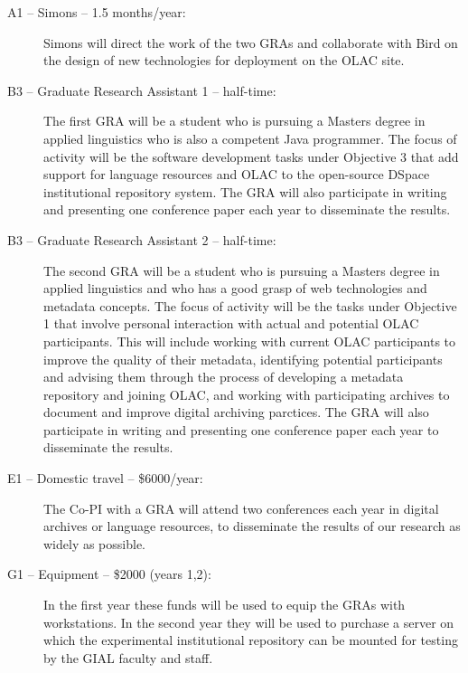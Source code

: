 \documentclass[11pt]{nsf}
\begin{document}
\begin{description}
\item[A1 -- Simons -- 1.5 months/year:]
Simons will direct the work of the two GRAs and collaborate with Bird
on the design of new technologies for deployment on the OLAC site.

\item[B3 -- Graduate Research Assistant 1 -- half-time:]
The first GRA will be a student who is pursuing a Masters degree in 
applied linguistics who is also
a competent Java programmer. The focus of activity will be
the software development tasks under Objective 3 that add
support for language resources and OLAC to the open-source DSpace
institutional repository system. The GRA will also participate
in writing and presenting one conference paper each year
to disseminate the results.

\item[B3 -- Graduate Research Assistant 2 -- half-time:]
The second GRA will be a student who is pursuing a Masters degree in 
applied linguistics and who has a good grasp of web technologies and
metadata concepts. The focus of activity will be
the tasks under Objective 1 that involve personal interaction
with actual and potential OLAC participants.  This will include
working with current OLAC participants to improve the quality of their
metadata, identifying potential participants and advising
them through the process of developing a metadata repository and joining
OLAC, and working with participating archives to document
and improve digital archiving parctices. The GRA will also participate
in writing and presenting one conference paper each year
to disseminate the results.

\item[E1 -- Domestic travel -- \$6000/year:]
The Co-PI with a GRA will attend two conferences each year in digital archives or
language resources, to disseminate the results of our research as
widely as possible.

\item[G1 -- Equipment -- \$2000 (years 1,2):]
In the first year these funds will be used
to equip the GRAs with workstations.  In the second year they will
be used to purchase a server on which the experimental institutional repository
can be mounted for testing by the GIAL faculty and staff.
\end{description}
\end{document}
